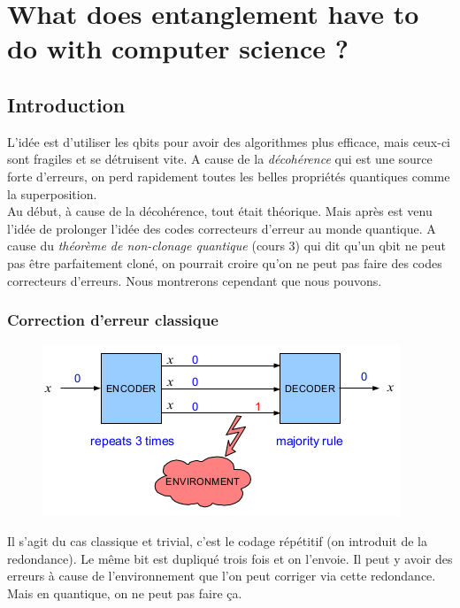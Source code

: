 \chapter{What does entanglement have to do with computer science ?}
\section{Introduction}
L'idée est d'utiliser les qbits pour avoir des algorithmes plus efficace, mais ceux-ci
sont fragiles et se détruisent vite. A cause de la \textit{décohérence} qui est une source
forte d'erreurs, on perd rapidement toutes les belles propriétés quantiques comme la superposition. \\

Au début, à cause de la décohérence, tout était théorique. Mais après est venu l'idée de 
prolonger l'idée des codes correcteurs d'erreur au monde quantique. A cause du \textit{théorème
de non-clonage quantique} (cours 3) qui dit qu'un qbit ne peut pas être parfaitement cloné, on
pourrait croire qu'on ne peut pas faire des codes correcteurs d'erreurs. Nous montrerons cependant
que nous pouvons.

\subsection{Correction d'erreur classique}
	\begin{figure}
	\vspace{-5mm}
	\includegraphics[scale=0.3]{ch2/image1.png}
	\end{figure}
Il s'agit du cas classique et trivial, c'est le codage répétitif (on introduit de la redondance). Le même
bit est dupliqué trois fois et on l'envoie. Il peut y avoir des erreurs à cause de l'environnement que
l'on peut corriger via cette redondance. Mais en quantique, on ne peut pas faire ça.

